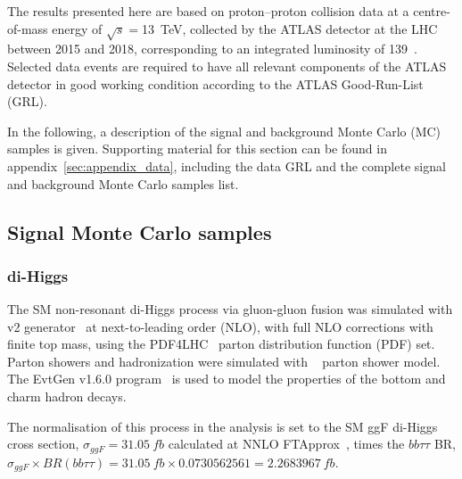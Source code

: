 The results presented here are based on proton–proton collision data at a centre-of-mass energy of $\sqrt{s}=$13~TeV, collected by the ATLAS detector at the LHC between 2015 and 2018, corresponding to an integrated luminosity of 139~\ifb. Selected data events are required to have all relevant components of the ATLAS detector in good working condition according to the ATLAS Good-Run-List (GRL).

In the following, a description of the signal and background Monte Carlo (MC) samples is given. Supporting material for this section can be found in appendix~\ref{sec:appendix_data}, including the data GRL and the complete signal and background Monte Carlo samples list.

\subsection{Signal Monte Carlo samples}

\subsubsection{di-Higgs}

The SM non-resonant di-Higgs process via gluon-gluon fusion was simulated with \POWHEGBOX v2 generator~\cite{Powheg1, Powheg2, Powheg3} at next-to-leading order (NLO), with full NLO corrections with finite top mass, using the PDF4LHC~\cite{Butterworth:2015oua} parton distribution function (PDF) set. Parton showers and hadronization were simulated with ~\cite{Herwigpp} parton shower model. The EvtGen v1.6.0 program~\cite{EvtGen} is used to model the properties of the bottom and charm hadron decays.

The normalisation of this process in the analysis is set to the SM ggF di-Higgs cross section, $\sigma_{ggF}=\SI{31.05}{fb}$ calculated at NNLO FTApprox~\cite{Grazzini:2018bsd}, times the $bb\tau\tau$ BR, $\sigma_{ggF} \times BR (bb \tau\tau)  = \SI{31.05}{fb} \times 0.0730562561  =  \SI{2.2683967}{fb}$.  

